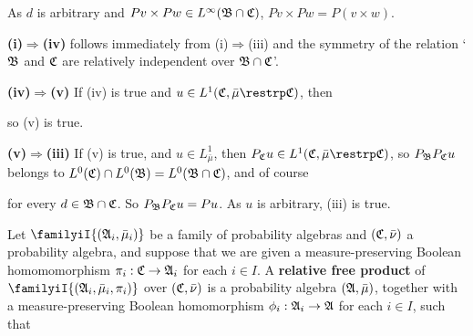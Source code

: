 {\noindent As $d$ is arbitrary and
$Pv\times Pw\in L^{\infty}(\frak B\cap\frak C)$,
$Pv\times Pw=P(v\times w)$.

\medskip

{\bf (i)$\Rightarrow$(iv)} follows immediately from (i)$\Rightarrow$(iii)
and the symmetry of the relation `$\frak B$ and $\frak C$ are
relatively independent over $\frak B\cap\frak C$'.

\medskip

{\bf (iv)$\Rightarrow$(v)} If (iv) is true and
$u\in L^1(\frak C,\bar\mu\restrp\frak C)$, then


\noindent so (v) is true.

\medskip

{\bf (v)$\Rightarrow$(iii)} If (v) is true, and
$u\in L^1_{\bar\mu}$, then
$P_{\frak C}u\in L^1(\frak C,\bar\mu\restrp\frak C)$, so
$P_{\frak B}P_{\frak C}u$ belongs to
$L^0(\frak C)\cap L^0(\frak B)=L^0(\frak B\cap\frak C)$, and of course


\noindent for every
$d\in\frak B\cap\frak C$.   So $P_{\frak B}P_{\frak C}u=Pu$.
As $u$ is arbitrary, (iii) is true.
}%

 Let
$\familyiI{(\frak A_i,\bar\mu_i)}$ be a family of probability algebras
and $(\frak C,\bar\nu)$ a probability algebra, and suppose that we are
given a measure-preserving Boolean homomomorphism
$\pi_i:\frak C\to\frak A_i$
for each $i\in I$.   A {\bf relative free product} of
$\familyiI{(\frak A_i,\bar\mu_i,\pi_i)}$ over
$(\frak C,\bar\nu)$ is a probability algebra
$(\frak A,\bar\mu)$, together with a measure-preserving Boolean
homomorphism $\phi_i:\frak A_i\to\frak A$ for each $i\in I$, such that


